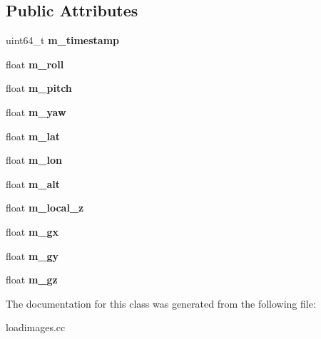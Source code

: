 \subsection*{Public Attributes}
\begin{DoxyCompactItemize}
\item 
\hypertarget{classpxIMUImageData_aa6189fb17a8040fd6ce35959ae3d7f9c}{
uint64\_\-t {\bfseries m\_\-timestamp}}
\label{classpxIMUImageData_aa6189fb17a8040fd6ce35959ae3d7f9c}

\item 
\hypertarget{classpxIMUImageData_a747e31167d96c2caf5e25649ee7bac8f}{
float {\bfseries m\_\-roll}}
\label{classpxIMUImageData_a747e31167d96c2caf5e25649ee7bac8f}

\item 
\hypertarget{classpxIMUImageData_aaebf29bee19896c91a072b91dae35330}{
float {\bfseries m\_\-pitch}}
\label{classpxIMUImageData_aaebf29bee19896c91a072b91dae35330}

\item 
\hypertarget{classpxIMUImageData_a500ee05e6444fbfc9c63f905474e5dd6}{
float {\bfseries m\_\-yaw}}
\label{classpxIMUImageData_a500ee05e6444fbfc9c63f905474e5dd6}

\item 
\hypertarget{classpxIMUImageData_a2877ea07dd3d3473f88b7a7f7483cc0a}{
float {\bfseries m\_\-lat}}
\label{classpxIMUImageData_a2877ea07dd3d3473f88b7a7f7483cc0a}

\item 
\hypertarget{classpxIMUImageData_a686274be524ba9835509930d4a4664bc}{
float {\bfseries m\_\-lon}}
\label{classpxIMUImageData_a686274be524ba9835509930d4a4664bc}

\item 
\hypertarget{classpxIMUImageData_ac9cb9ce48f29ba096a025054527aaf01}{
float {\bfseries m\_\-alt}}
\label{classpxIMUImageData_ac9cb9ce48f29ba096a025054527aaf01}

\item 
\hypertarget{classpxIMUImageData_ac235d12c6a3d875bdbf821b1cfe4bfb6}{
float {\bfseries m\_\-local\_\-z}}
\label{classpxIMUImageData_ac235d12c6a3d875bdbf821b1cfe4bfb6}

\item 
\hypertarget{classpxIMUImageData_abbf3cb2868376d0cc02e42ff58661a1f}{
float {\bfseries m\_\-gx}}
\label{classpxIMUImageData_abbf3cb2868376d0cc02e42ff58661a1f}

\item 
\hypertarget{classpxIMUImageData_afd33e6359ec06cbd6c01e49b1a64e2d3}{
float {\bfseries m\_\-gy}}
\label{classpxIMUImageData_afd33e6359ec06cbd6c01e49b1a64e2d3}

\item 
\hypertarget{classpxIMUImageData_a495e552341fe6910212476f11f97be86}{
float {\bfseries m\_\-gz}}
\label{classpxIMUImageData_a495e552341fe6910212476f11f97be86}

\end{DoxyCompactItemize}


The documentation for this class was generated from the following file:\begin{DoxyCompactItemize}
\item 
loadimages.cc\end{DoxyCompactItemize}
